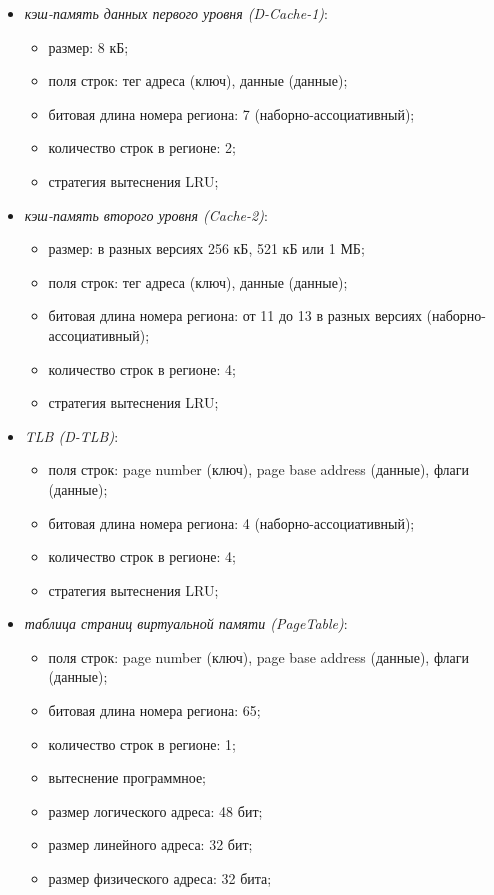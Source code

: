 \documentclass[14pt]{extreport}
\newcommand{\LRU}{\textsf{LRU}\xspace}
\begin{document}
\begin{itemize}
  \item \emph{кэш-память данных первого уровня (D-Cache-1)}:
        \begin{itemize}
            \item размер: 8 кБ;
            \item поля строк: тег адреса (ключ), данные (данные);
            \item битовая длина номера региона: 7 (наборно-ассоциативный);
            \item количество строк в регионе: 2;
            \item стратегия вытеснения \LRU;
        \end{itemize}

  \item \emph{кэш-память второго уровня (Cache-2)}:
        \begin{itemize}
            \item размер: в разных версиях 256 кБ, 521 кБ или 1 МБ;
            \item поля строк: тег адреса (ключ), данные (данные);
            \item битовая длина номера региона: от 11 до 13 в разных версиях
(наборно-ассоциативный);
            \item количество строк в регионе: 4;
            \item стратегия вытеснения \LRU;
        \end{itemize}

  \item \emph{TLB (D-TLB)}:
        \begin{itemize}
            \item поля строк: page number (ключ), page base address (данные),
флаги (данные);
            \item битовая длина номера региона: 4 (наборно-ассоциативный);
            \item количество строк в регионе: 4;
            \item стратегия вытеснения \LRU;
        \end{itemize}

  \item \emph{таблица страниц виртуальной памяти (PageTable)}:
    \begin{itemize}
        \item поля строк: page number (ключ), page base address (данные), флаги
(данные);
        \item битовая длина номера региона: 65;
        \item количество строк в регионе: 1;
        \item вытеснение программное;
        \item размер логического адреса: 48 бит;
        \item размер линейного адреса: 32 бит;
        \item размер физического адреса: 32 бита;
    \end{itemize}



\end{itemize}
\end{document}
